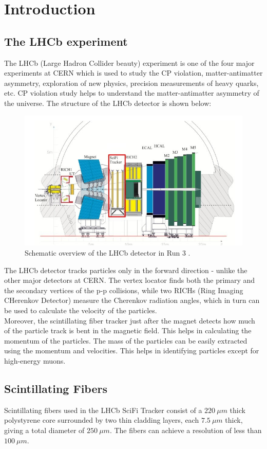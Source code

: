 \chapter{Introduction}

    \section{The LHCb experiment}
    The LHCb (Large Hadron Collider beauty) experiment is one of the four major experiments at CERN which is used to study the CP violation, matter-antimatter asymmetry, exploration of new physics, precision measurements of heavy quarks, etc. CP violation study helps to understand the matter-antimatter asymmetry of the universe. The structure of the LHCb detector is shown below:
    \begin{figure}[H]
    \centering
    \includegraphics[width=0.8\linewidth]{Figure/LHCb.jpg}
    \caption{Schematic overview of the LHCb detector in Run 3 \cite{lhcb}.}
    \end{figure}
    
    The LHCb detector tracks particles only in the forward direction - unlike the other major detectors at CERN. The vertex locator finds both the primary and the  secondary vertices of the p-p collisions, while two RICHs (Ring Imaging CHerenkov Detector) measure the Cherenkov radiation angles, which in turn can be used to calculate the velocity of the particles.\\
    
    Moreover, the scintillating fiber tracker just after the magnet detects how much of the particle track is bent in the magnetic field. This helps in calculating the momentum of the particles. The mass of the particles can be easily extracted using the momentum and velocities. This helps in identifying particles except for high-energy muons.  
    
    \section{Scintillating Fibers}
    Scintillating fibers used in the LHCb SciFi Tracker consist of a $220~\mu m$ thick polystyrene core surrounded by two thin cladding layers, each $7.5~\mu m$ thick, giving a total diameter of $250~\mu m$. The fibers can achieve a resolution of less than $100~\mu m$. 

